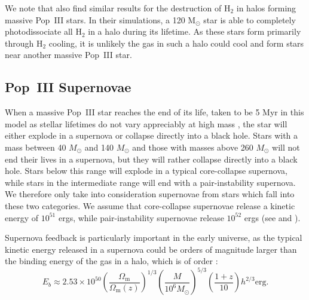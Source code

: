 \documentclass[a4paper,fleqn,usenatbib]{mnras}
\begin{document}
We note that \citet{whalen_2008} also find similar results for the destruction 
of H$_2$ in halos forming massive Pop~III stars. In their simulations, a 120 M$_\odot$ star is able to completely photodissociate all H$_2$ in a halo during its lifetime. As these stars form primarily through H$_2$ cooling, it is unlikely the gas in such a halo could cool and form stars near another massive Pop~III star.



\subsection{Pop~III Supernovae}
\label{sec:SN}

When a massive Pop~III star reaches the end of its life, taken to be 5 Myr in this model as stellar lifetimes do not vary 
appreciably at high mass \citep[][]{schaerer_2002}, the star will either explode in a supernova or collapse directly into a black hole. Stars with a mass between 40 $M_\odot$ and 140 $M_\odot$ and those with masses above 260 $M_\odot$ will not end their lives in a supernova, but they will rather 
collapse directly into a black hole.  Stars below this range will explode in a typical core-collapse supernova, while stars in the intermediate range  will end with a 
pair-instability supernova.  We therefore only take into consideration supernovae from stars which fall into these two categories. We assume that core-collapse supernovae release a kinetic energy of $10^{51}$ ergs, while pair-instability supernovae release $10^{52}$ ergs (see \citealt{wise_2008} and \citealt{greif_2010}).

Supernova feedback is particularly important in the early universe, as the typical kinetic energy released in a supernova could be orders of magnitude 
larger than the binding energy of the gas in a halo, which is of order 
\citep{first_galaxies}:
\begin{equation}
E_b \approx 2.53 \times 10^{50} \left(\frac{\Omega_\text{m}}{\Omega_\text{m}(z)} \right)^{1/3} 
 \left( \frac{M}{10^6 M_\odot} \right)^{5/3} \left( \frac{1+z}{10}\right) h^{2/3} \text{erg}.
 \label{eq:Eb}
\end{equation}
\end{document}
